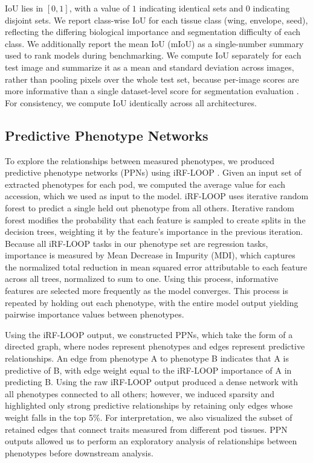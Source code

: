 IoU lies in $[0, 1]$, with a value of $1$ indicating identical sets and $0$ indicating disjoint sets. We report class-wise IoU for each tissue class (wing, envelope, seed), reflecting the differing biological importance and segmentation difficulty of each class. We additionally report the mean IoU (mIoU) as a single-number summary used to rank models during benchmarking. We compute IoU separately for each test image and summarize it as a mean and standard deviation across images, rather than pooling pixels over the whole test set, because per-image scores are more informative than a single dataset-level score for segmentation evaluation \cite{csurka2013evaluation}. For consistency, we compute IoU identically across all architectures.

\subsection{Predictive Phenotype Networks}\label{sec:ch2-pen}
To explore the relationships between measured phenotypes, we produced predictive phenotype networks (PPNs) using iRF-LOOP \cite{cliff2019high}. Given an input set of extracted phenotypes for each pod, we computed the average value for each accession, which we used as input to the model. iRF-LOOP uses iterative random forest \cite{basu2018iterative} to predict a single held out phenotype from all others. Iterative random forest modifies the probability that each feature is sampled to create splits in the decision trees, weighting it by the feature's importance in the previous iteration. Because all iRF-LOOP tasks in our phenotype set are regression tasks, importance is measured by Mean Decrease in Impurity (MDI), which captures the normalized total reduction in mean squared error attributable to each feature across all trees, normalized to sum to one. Using this process, informative features are selected more frequently as the model converges. This process is repeated by holding out each phenotype, with the entire model output yielding pairwise importance values between phenotypes.

Using the iRF-LOOP output, we constructed PPNs, which take the form of a directed graph, where nodes represent phenotypes and edges represent predictive relationships. An edge from phenotype A to phenotype B indicates that A is predictive of B, with edge weight equal to the iRF-LOOP importance of A in predicting B. Using the raw iRF-LOOP output produced a dense network with all phenotypes connected to all others; however, we induced sparsity and highlighted only strong predictive relationships by retaining only edges whose weight falls in the top 5\%. For interpretation, we also visualized the subset of retained edges that connect traits measured from different pod tissues. PPN outputs allowed us to perform an exploratory analysis of relationships between phenotypes before downstream analysis.

